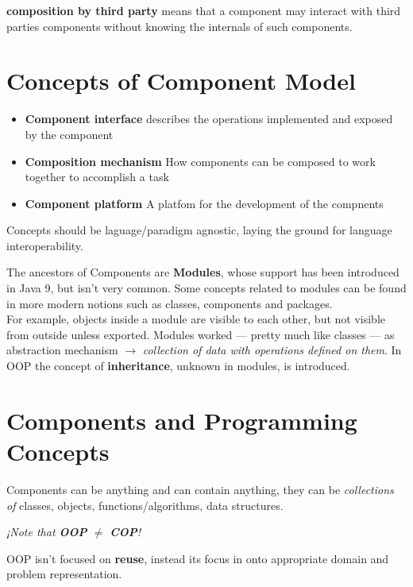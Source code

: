 \textbf{composition by third party} means that a component may interact with third parties components without knowing the internals of such components.

\section{Concepts of Component Model}
\begin{itemize}
    \item \textbf{Component interface} describes the operations implemented and exposed by the component
    \item \textbf{Composition mechanism} How components can be composed to work together to accomplish a task
    \item \textbf{Component platform} A platfom for the development of the compnents
\end{itemize}
Concepts should be laguage/paradigm agnostic, laying the ground for language interoperability.
\nl

The ancestors of Components are \textbf{Modules}, whose support has been introduced in Java 9,
but isn't very common.
Some concepts related to modules can be found in more modern notions such as classes, components and packages.\\
For example, objects inside a module are visible to each other, but not visible from outside unless exported.
Modules worked {---} pretty much like classes {---} as abstraction mechanism $\rightarrow$ \textit{collection of data with operations defined on them}.
In OOP the concept of \textbf{inheritance}, unknown in modules, is introduced.
\nl


\section{Components and Programming Concepts}
Components can be anything and can contain anything, they can be \textit{collections of} classes, objects, functions/algorithms, data structures.

\begin{center}
\textit{¡Note that \textbf{OOP} $\neq$ \textbf{COP}!}
\end{center}

OOP isn't focused on \textbf{reuse}, instead its focus in onto appropriate domain and problem representation.

